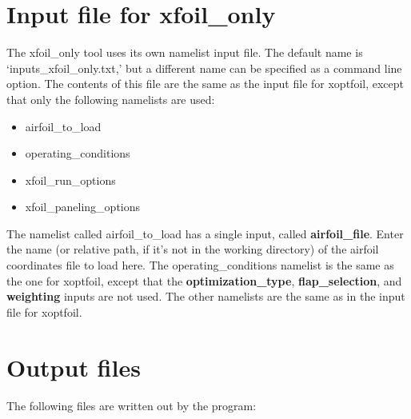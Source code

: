\documentclass[11pt]{article}
\begin{document}
\section{Input file for xfoil\_only}

The xfoil\_only tool uses its own namelist input file. The default name is
`inputs\_xfoil\_only.txt,' but a different name can be specified as a command line option.
The contents of this file are the same as the input file for xoptfoil, except that only
the following namelists are used:

\begin{itemize}
\item{airfoil\_to\_load}
\item{operating\_conditions}
\item{xfoil\_run\_options}
\item{xfoil\_paneling\_options}
\end{itemize}

The namelist called airfoil\_to\_load has a single input, called \textbf{airfoil\_file}.
Enter the name (or relative path, if it's not in the working directory) of the airfoil 
coordinates file to load here.  The operating\_conditions namelist is the same as the one
for xoptfoil, except that the \textbf{optimization\_type}, \textbf{flap\_selection}, and 
\textbf{weighting} inputs are not used. The other namelists are the same as in the input 
file for xoptfoil.

\section{Output files}\label{sec:output_files}

The following files are written out by the program:
\end{document}
